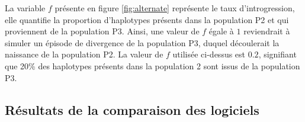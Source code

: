 \documentclass[12pt,twoside]{reedthesis}
\begin{document}
  La variable \(f\) présente en figure \ref{fig:alternate} représente le
  taux d'introgression, elle quantifie la proportion d'haplotypes présents
  dans la population P2 et qui proviennent de la population P3. Ainsi, une
  valeur de \(f\) égale à \(1\) reviendrait à simuler un épisode de
  divergence de la population P3, duquel découlerait la naissance de la
  population P2. La valeur de \(f\) utilisée ci-dessus est \(0.2\),
  signifiant que 20\% des haplotypes présents dans la population 2 sont
  issus de la population P3.
  
  \subsection{Résultats de la comparaison des
  logiciels}\label{resultats-de-la-comparaison-des-logiciels}
  
  \begin{Shaded}
  \begin{Highlighting}[]
  \StringTok{ }\NormalTok{(} \NormalTok{(}\NormalTok{, }\NormalTok{, }\NormalTok{, }\NormalTok{, }\NormalTok{),}
                       \NormalTok{(}\NormalTok{, }\NormalTok{, }\NormalTok{, }\NormalTok{, }\NormalTok{),}
                       \NormalTok{(}\NormalTok{, }\NormalTok{, }\NormalTok{, }\NormalTok{, }\NormalTok{),}
                       \NormalTok{(}\NormalTok{, }\NormalTok{, }\NormalTok{, }\NormalTok{, }\NormalTok{))}
  
                \NormalTok{(}\NormalTok{, }
                             \NormalTok{,}
                             \NormalTok{, }
                             \NormalTok{), }
                \NormalTok{)}
  \end{Highlighting}
  \end{Shaded}
  
\end{document}
